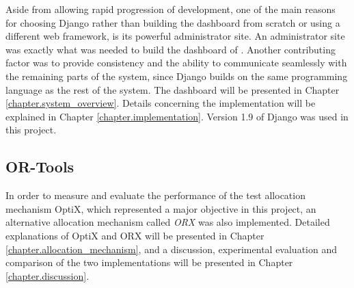 
Aside from allowing rapid progression of development, one of the main reasons for choosing Django rather than building the dashboard from scratch or using a different web framework, is its powerful administrator site. An administrator site was exactly what was needed to build the dashboard of \toolname. Another contributing factor was to provide consistency and the ability to communicate seamlessly with the remaining parts of the system, since Django builds on the same programming language as the rest of the system. The dashboard will be presented in Chapter \ref{chapter.system_overview}. Details concerning the implementation will be explained in Chapter \ref{chapter.implementation}. Version 1.9 of Django was used in this project.

\subsection{OR-Tools}\label{subsection.ortools}

In order to measure and evaluate the performance of the test allocation mechanism OptiX, which represented a major objective in this project, an alternative allocation mechanism called \emph{ORX} was also implemented. Detailed explanations of OptiX and ORX will be presented in Chapter \ref{chapter.allocation_mechanism}, and a discussion, experimental evaluation and comparison of the two implementations will be presented in Chapter \ref{chapter.discussion}.

